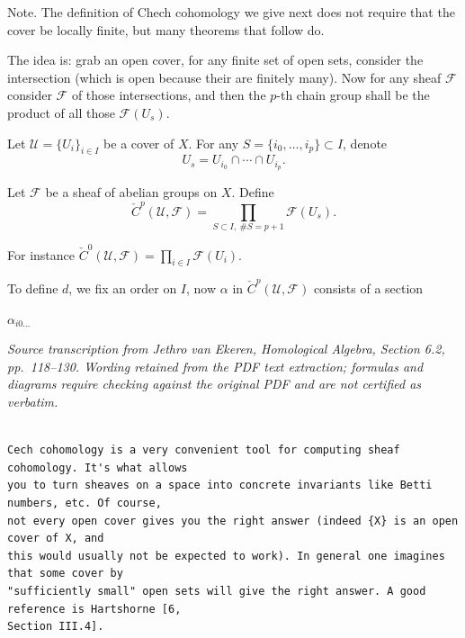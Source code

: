 Note. The definition of Chech cohomology we give next does not require that the cover be locally finite, but many theorems that follow do.

\medskip
\noindent
The idea is: grab an open cover, for any finite set of open sets, consider the intersection (which is open because their are finitely many). Now for any sheaf $\mathcal F$ consider $\mathcal F$ of those intersections, and then the $p$-th chain group shall be the product of all those $\mathcal F(U_s)$.

\medskip
Let $\mathcal U=\{U_i\}_{i\in I}$ be a cover of $X$. For any $S=\{i_0,\ldots,i_p\}\subset I$, denote
\[
U_s=U_{i_0}\cap\cdots\cap U_{i_p}.
\]

Let $\mathcal F$ be a sheaf of abelian groups on $X$. Define
\[
\check C^p(\mathcal U,\mathcal F)
=\prod_{S\subset I,\ \#S=p+1}\mathcal F(U_s).
\]

For instance $\check C^0(\mathcal U,\mathcal F)=\prod_{i\in I}\mathcal F(U_i)$.

To define $d$, we fix an order on $I$, now $\alpha$ in $\check C^p(\mathcal U,\mathcal F)$ consists of a section

$\alpha_{i0\ldots}$



\noindent\textit{Source transcription from Jethro van Ekeren, \emph{Homological Algebra}, Section 6.2, pp.~118--130. Wording retained from the PDF text extraction; formulas and diagrams require checking against the original PDF and are not certified as verbatim.}

\begin{Verbatim}[fontsize=\footnotesize]

Cech cohomology is a very convenient tool for computing sheaf cohomology. It's what allows
you to turn sheaves on a space into concrete invariants like Betti numbers, etc. Of course,
not every open cover gives you the right answer (indeed {X} is an open cover of X, and
this would usually not be expected to work). In general one imagines that some cover by
"sufficiently small" open sets will give the right answer. A good reference is Hartshorne [6,
Section III.4].



\end{Verbatim}


